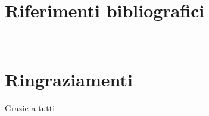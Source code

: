 \documentclass[12pt,a4paper,twoside]{book}
\begin{document}









\renewcommand{\bibsection}{}
\chapter*{Riferimenti bibliografici}

\newpage

\newpage~\newpage
\chapter*{Ringraziamenti}
Grazie a tutti
\end{document}
